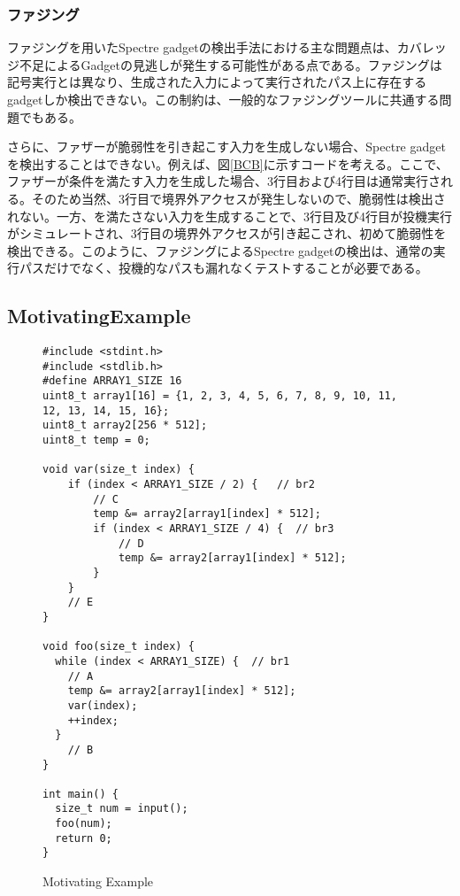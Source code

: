 \subsubsection{ファジング}
ファジングを用いたSpectre gadgetの検出手法における主な問題点は、カバレッジ不足によるGadgetの見逃しが発生する可能性がある点である。ファジングは記号実行とは異なり、生成された入力によって実行されたパス上に存在するgadgetしか検出できない。この制約は、一般的なファジングツールに共通する問題でもある。\par
さらに、ファザーが脆弱性を引き起こす入力を生成しない場合、Spectre gadgetを検出することはできない。例えば、図\ref{BCB}に示すコードを考える。ここで、ファザーが条件を満たす入力を生成した場合、3行目および4行目は通常実行される。そのため当然、3行目で境界外アクセスが発生しないので、脆弱性は検出されない。一方、を満たさない入力を生成することで、3行目及び4行目が投機実行がシミュレートされ、3行目の境界外アクセスが引き起こされ、初めて脆弱性を検出できる。このように、ファジングによるSpectre gadgetの検出は、通常の実行パスだけでなく、投機的なパスも漏れなくテストすることが必要である。\par

\subsection{MotivatingExample}

\begin{figure}
  \begin{verbatim}
#include <stdint.h>
#include <stdlib.h>
#define ARRAY1_SIZE 16
uint8_t array1[16] = {1, 2, 3, 4, 5, 6, 7, 8, 9, 10, 11, 12, 13, 14, 15, 16};
uint8_t array2[256 * 512];
uint8_t temp = 0;

void var(size_t index) {
    if (index < ARRAY1_SIZE / 2) {   // br2
        // C
        temp &= array2[array1[index] * 512];
        if (index < ARRAY1_SIZE / 4) {  // br3
            // D
            temp &= array2[array1[index] * 512];
        }
    }
    // E
}

void foo(size_t index) {
  while (index < ARRAY1_SIZE) {  // br1
    // A
    temp &= array2[array1[index] * 512];
    var(index);
    ++index;
  }
    // B
}

int main() {
  size_t num = input();
  foo(num);
  return 0;
}
   \end{verbatim}
  \caption{Motivating Example}
  \label{MotivatingExample}
\end{figure}

